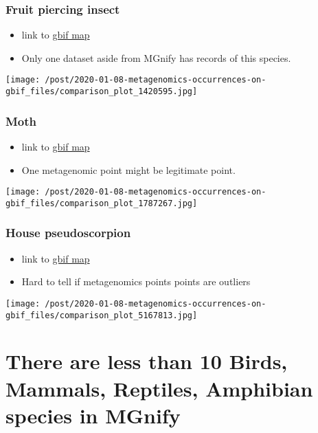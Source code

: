 \documentclass[]{article}
\providecommand{\tightlist}{%
  \setlength{\itemsep}{0pt}\setlength{\parskip}{0pt}}
\begin{document}
\hypertarget{fruit-piercing-insect}{%
\subsubsection{Fruit piercing insect}\label{fruit-piercing-insect}}

\begin{itemize}
\tightlist
\item
  link to
  \href{https://www.gbif.org/occurrence/map?taxon_key=1420595}{gbif map}
\item
  Only one dataset aside from MGnify has records of this species.
\end{itemize}

\texttt{[image: /post/2020-01-08-metagenomics-occurrences-on-gbif\_files/comparison\_plot\_1420595.jpg]}

\hypertarget{moth}{%
\subsubsection{Moth}\label{moth}}

\begin{itemize}
\tightlist
\item
  link to
  \href{https://www.gbif.org/occurrence/map?taxon_key=1787267}{gbif map}
\item
  One {metagenomic point} might be legitimate point.
\end{itemize}

\texttt{[image: /post/2020-01-08-metagenomics-occurrences-on-gbif\_files/comparison\_plot\_1787267.jpg]}

\hypertarget{house-pseudoscorpion}{%
\subsubsection{House pseudoscorpion}\label{house-pseudoscorpion}}

\begin{itemize}
\tightlist
\item
  link to
  \href{https://www.gbif.org/occurrence/map?taxon_key=5167813}{gbif map}
\item
  Hard to tell if {metagenomics points} points are outliers
\end{itemize}

\texttt{[image: /post/2020-01-08-metagenomics-occurrences-on-gbif\_files/comparison\_plot\_5167813.jpg]}

\hypertarget{there-are-less-than-10-birds-mammals-reptiles-amphibian-species-in-mgnify}{%
\section{There are less than 10 Birds, Mammals, Reptiles, Amphibian
species in
MGnify}\label{there-are-less-than-10-birds-mammals-reptiles-amphibian-species-in-mgnify}}
\end{document}
